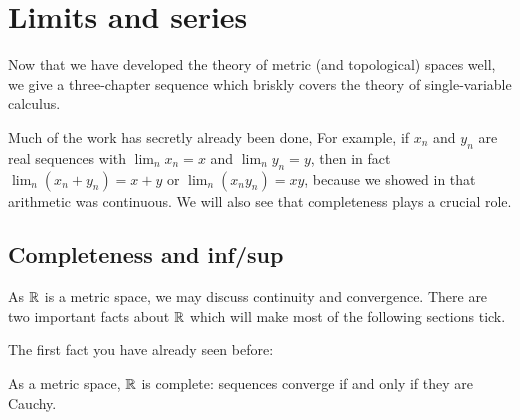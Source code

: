 \chapter{Limits and series}
\label{ch:calc_limits}
Now that we have developed the theory
of metric (and topological) spaces well,
we give a three-chapter sequence which
briskly covers the theory of single-variable calculus.

Much of the work has secretly already been done,
For example, if $x_n$ and $y_n$ are real sequences
with $\lim_n x_n = x$ and $\lim_n y_n = y$,
then in fact $\lim_n (x_n + y_n) = x+y$
or $\lim_n (x_n y_n) = xy$,
because we showed in 
that arithmetic was continuous.
We will also see that completeness plays a crucial role.

\section{Completeness and inf/sup}
As $\RR$ is a metric space,
we may discuss continuity and convergence.
There are two important facts about $\RR$
which will make most of the following sections tick.

The first fact you have already seen before:
\begin{theorem}
	[$\RR$ is complete]
	\label{thm:complete_R}
	As a metric space, $\RR$ is complete:
	sequences converge if and only if they are Cauchy.
\end{theorem}

